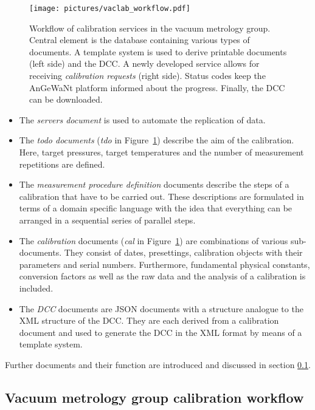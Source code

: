 \documentclass[3p,times,procedia]{elsarticle}
\begin{document}
\begin{figure}
    \centering
    \texttt{[image: pictures/vaclab\_workflow.pdf]}
    \caption{Workflow of calibration services in the vacuum metrology
    group. Central element is the database containing various types
    of documents. A template system is used to derive printable
    documents (left side) and the DCC. A newly developed service allows
    for receiving \emph{calibration requests} (right side). Status
    codes keep the AnGeWaNt platform informed about the progress.
    Finally, the DCC can be downloaded.}
    \label{fig:vl-work}
\end{figure}

\begin{itemize}
  \item The \emph{servers document} is used to automate the
    replication of data.
  \item The \emph{todo documents} (\emph{tdo} in
    Figure~\ref{fig:vl-work}) describe the aim of the
    calibration. Here, target pressures, target temperatures and the
    number of measurement repetitions are defined.
  \item The \emph{measurement procedure definition} documents describe
    the steps of a calibration that have to be carried out. These
    descriptions are formulated in terms of a domain specific language
    with the idea that everything can be arranged in a sequential
    series of parallel steps.
  \item The \emph{calibration} documents (\emph{cal} in
    Figure~\ref{fig:vl-work}) are combinations of various
    sub-documents. They consist of dates, presettings, calibration
    objects with their parameters and serial numbers. Furthermore,
    fundamental physical constants, conversion factors as well as the raw data and
    the analysis of a calibration
    is included.
    \item The \emph{DCC} documents are JSON documents with a structure
      analogue to the XML structure of the DCC. They are each derived
      from a calibration document and used to generate the DCC in the
      XML format by means of a template system.
\end{itemize}

Further documents and their function are introduced and discussed in
section \ref{ssec:vl-work}.

\subsection{Vacuum metrology group calibration workflow}
\label{ssec:vl-work}
\end{document}
